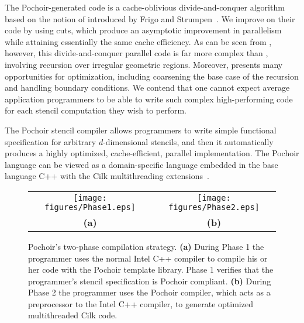 The Pochoir-generated  code is a cache-oblivious
\cite{FrigoLePr99,Prokop99} divide-and-conquer algorithm based on the
notion of  introduced by Frigo and
Strumpen~\cite{FrigoSt05, FrigoSt09}.  We improve on their code by
using  cuts, which produce an asymptotic improvement
in parallelism while attaining essentially the same cache efficiency.
As can be seen from , however, this
divide-and-conquer parallel code is far more complex than
, involving recursion over irregular geometric regions.
Moreover,  presents many opportunities for optimization,
including coarsening the base case of the recursion and handling
boundary conditions.  We contend that one cannot expect average
application programmers to be able to write such complex
high-performing code for each stencil computation they wish to
perform.

The Pochoir stencil compiler allows programmers to write simple
functional specification for arbitrary $d$-dimensional stencils, and
then it automatically produces a highly optimized, cache-efficient,
parallel implementation.  The Pochoir language can be viewed as a
domain-specific language \cite{Hudak96, MernikHeSl05,
  vanDeursenKlVi00} embedded in the base language C++ with the Cilk
multithreading extensions~\cite{IntelCilkPlus10}.

\begin{figure*}[t]
\centering
\begin{tabular}{c@{\hspace*{1cm}}c}
\texttt{[image: figures/Phase1.eps]}
&
\texttt{[image: figures/Phase2.eps]}\\
\textbf{(a)} & \textbf{(b)}
\end{tabular}
\caption{ Pochoir's two-phase compilation strategy.  \textbf{(a)}
  During Phase 1 the programmer uses the normal Intel C++ compiler to
  compile his or her code with the Pochoir template library.  Phase 1
  verifies that the programmer's stencil specification is Pochoir
  compliant.  \textbf{(b)} During Phase 2 the programmer uses the
  Pochoir compiler, which acts as a preprocessor to the Intel C++
  compiler, to generate optimized multithreaded Cilk code.}

\label{fig:phases}
\end{figure*}

